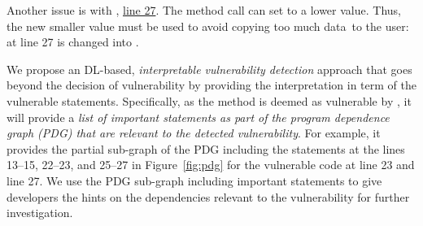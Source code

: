 Another issue is with
, \underline{line 27}. The method call 
 can set  to a lower
value. Thus, the new smaller value must be used to avoid copying too
much data~to the user:  at line 27 is changed
into .



We propose an DL-based, {\em interpretable vulnerability detection}
approach that goes beyond the decision of vulnerability by providing
the interpretation in term of the vulnerable
statements. Specifically, as the method is deemed as vulnerable by
{\tool}, it will provide a {\em list of important statements as part
  of the program dependence graph (PDG) that are relevant to the
  detected vulnerability}. For example, it provides the partial
sub-graph of the PDG including the statements at the lines 13--15,
22--23, and 25--27 in Figure~\ref{fig:pdg} for the vulnerable code at
line 23 and line 27. We use the PDG sub-graph including important
statements to give developers the hints on the dependencies relevant
to the vulnerability for further investigation.


%
